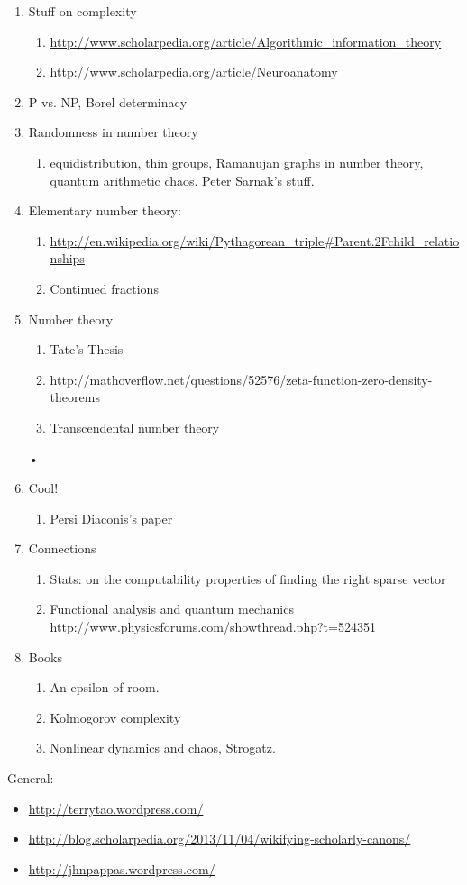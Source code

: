 \begin{enumerate}
\item
Stuff on complexity
\begin{enumerate}
\item 
\url{http://www.scholarpedia.org/article/Algorithmic_information_theory}
\item
\url{http://www.scholarpedia.org/article/Neuroanatomy}
\end{enumerate}
\item P vs. NP, Borel determinacy
\item Randomness in number theory
\begin{enumerate}
\item
 equidistribution, thin groups, Ramanujan graphs in number theory, quantum arithmetic chaos. Peter Sarnak's stuff.
\end{enumerate}
\item Elementary number theory:
\begin{enumerate}
\item \url{http://en.wikipedia.org/wiki/Pythagorean_triple\#Parent.2Fchild_relationships}
\item Continued fractions
\end{enumerate}
\item Number theory
\begin{enumerate}
\item Tate's Thesis
\item
http://mathoverflow.net/questions/52576/zeta-function-zero-density-theorems
\item Transcendental number theory
\end{enumerate}•
\item Cool!
\begin{enumerate}
\item
Persi Diaconis's paper
\end{enumerate}
\item Connections
\begin{enumerate}
\item Stats: on the computability properties of finding the right sparse vector
\item Functional analysis and quantum mechanics
http://www.physicsforums.com/showthread.php?t=524351
\end{enumerate}
\item Books
\begin{enumerate}
\item
An epsilon of room.
\item Kolmogorov complexity
\item Nonlinear dynamics and chaos, Strogatz.
\end{enumerate}
\end{enumerate}

General:
\begin{itemize}
\item
\url{http://terrytao.wordpress.com/}
\item
\url{http://blog.scholarpedia.org/2013/11/04/wikifying-scholarly-canons/}
\item
\url{http://jhnpappas.wordpress.com/}
\end{itemize}


\printindex

%
 
%
%
